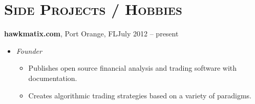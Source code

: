 \documentclass[10pt]{article}
\begin{document}
\section*{\textsc{Side Projects / Hobbies}}
\textbf{hawkmatix.com}, Port Orange, FL\hfill July 2012 -- present
\begin{itemize}[noitemsep]
    \item[] \textit{Founder}
    \begin{itemize}[noitemsep]
        \item Publishes open source financial analysis and trading software with documentation.
        \item Creates algorithmic trading strategies based on a variety of paradigms.
    \end{itemize}
\end{itemize}
\end{document}
